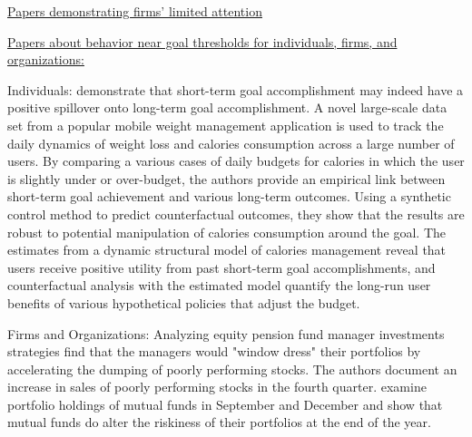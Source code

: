 \underline{Papers demonstrating firms' limited attention}

\underline{Papers about behavior near goal thresholds for individuals, firms, and organizations:}

Individuals:
\citet{uetake2017success} demonstrate that short-term goal accomplishment may indeed have a positive spillover onto long-term goal accomplishment. A novel large-scale data set from a popular mobile weight management application is used to track the daily dynamics of weight loss and calories consumption across a large number of users. By comparing a various cases of daily budgets for calories in which the user is slightly under or over-budget, the authors provide an empirical link between short-term goal achievement and various long-term outcomes. Using a synthetic control method to predict counterfactual outcomes, they show that the results are robust to potential manipulation of calories consumption around the goal. The estimates from a dynamic structural model of calories management reveal that users receive positive utility from past short-term goal accomplishments, and counterfactual analysis with the estimated model quantify the long-run user benefits of various hypothetical policies that adjust the budget.

Firms and Organizations: 
Analyzing equity pension fund manager investments strategies \citet{lakonishok1991window} find that the managers would "window dress" their portfolios by accelerating the dumping of poorly performing stocks. The authors document an increase in sales of poorly performing stocks in the fourth quarter.
\citet{chevalier1997risk} examine portfolio holdings of mutual funds in September and December and show that mutual funds do alter the riskiness of their portfolios at the end of the year.

